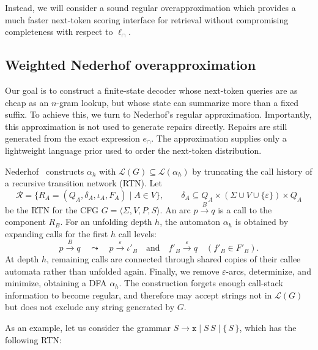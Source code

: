 \documentclass[popl.tex]{subfiles}
\begin{document}
Instead, we will consider a sound regular overapproximation which provides a much faster next-token scoring interface for retrieval without compromising completeness with respect to $\ell_\cap$.

\subsection{Weighted Nederhof overapproximation}\label{sec:wdfa_retrieval}

Our goal is to construct a finite-state decoder whose next-token queries are as cheap as an \(n\)-gram lookup, but whose state can summarize more than a fixed suffix. To achieve this, we turn to Nederhof's regular approximation. Importantly, this approximation is not used to generate repairs directly. Repairs are still generated from the exact expression \(e_\cap\). The approximation supplies only a lightweight language prior used to order the next-token distribution.

Nederhof~\cite{nederhof2000practical} constructs \(\alpha_h\) with \(\mathcal{L}(G)\subseteq\mathcal{L}(\alpha_h)\) by truncating the call history of a recursive transition network (RTN). Let
\[
  \mathcal{R}=\{R_A=(Q_A,\delta_A,\iota_A,F_A)\mid A\in V\},
  \qquad
  \delta_A\subseteq Q_A\times(\Sigma\cup V\cup\{\varepsilon\})\times Q_A
\]
be the RTN for the CFG \(G=\langle\Sigma,V,P,S\rangle\).  An arc \(p\overset{B}{\longrightarrow}q\) is a call to the component \(R_B\). For an unfolding depth \(h\), the automaton \(\alpha_h\) is obtained by expanding calls for the first \(h\) call levels:
\[
  p\overset{B}{\longrightarrow}q
  \quad\leadsto\quad
  p\overset{\varepsilon}{\longrightarrow}\iota'_B
  \quad\text{and}\quad
  f'_B\overset{\varepsilon}{\longrightarrow}q
  \quad(f'_B\in F'_B).
\]
At depth \(h\), remaining calls are connected through shared copies of their callee automata rather than unfolded again.  Finally, we remove \(\varepsilon\)-arcs, determinize, and minimize, obtaining a DFA \(\alpha_h\). The construction forgets enough call-stack information to become regular, and therefore may accept strings not in \(\mathcal{L}(G)\) but does not exclude any string generated by \(G\).

As an example, let us consider the grammar \(S \rightarrow \texttt{x} \mid S\,S \mid \texttt{\{}\,S\,\texttt{\}}\), which has the following RTN:

\begin{center}
  \resizebox{0.65\linewidth}{!}{}
\end{center}
\end{document}
